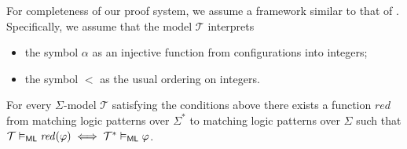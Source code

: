 For completeness of our proof system, we assume a framework similar to that of \cite{StefanescuCMMSR19}.
Specifically, we assume that the model $\mathcal{T}$ interprets
\begin{itemize}
    \item the symbol $\alpha$ as an injective function from configurations into integers;
    \item the symbol $<$ as the usual ordering on integers.
\end{itemize}
\begin{theorem}\label{thm:oracleLifting}
For every $\Sigma$-model $\mathcal{T}$
satisfying the conditions above
there exists a function $\mathit{red}$ from matching logic patterns over $\Sigma^*$
to matching logic patterns over $\Sigma$ such that
$\mathcal{T} \vDash_{\mathsf{ML}} \mathit{red}(\varphi) \iff \mathcal{T^*} \vDash_{\mathsf{ML}} \varphi$.
\end{theorem}
